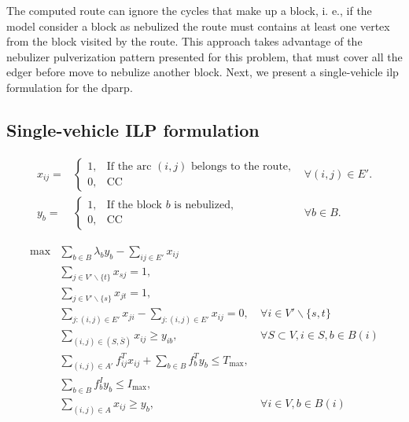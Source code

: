 \documentclass[a4paper,11pt]{article}
\begin{document}
The computed  route can ignore the  cycles that make up  a block, i. e.,  if the
model consider a block as nebulized the  route must contains at least one vertex
from  the block  visited by  the  route. This  approach takes  advantage of  the
nebulizer pulverization pattern presented for  this problem, that must cover all
the  edger  before   move  to  nebulize  another  block.  Next,   we  present  a
single-vehicle \gls{ilp} formulation for the \gls{dparp}.

\subsection{Single-vehicle ILP formulation}

\begin{align}
  \nonumber x_{ij} = & \begin{cases}
                         1, & \text{If the arc $(i, j)$ belongs to the route,} \\
                         0, & \text{CC} 
                       \end{cases} & \forall (i, j) \in E'. \\
  \nonumber y_{b} = & \begin{cases}
                         1, & \text{If the block $b$ is nebulized,} \\
                         0, & \text{CC} 
                       \end{cases} & \forall b \in B.
\end{align}


\begin{align}
  \max & \sum_{b \in B} \lambda_b y_{b} - \sum_{ij \in E'} x_{ij} & \label{eq:of}\\
       & \sum_{j \in V'\backslash \{t\}} x_{sj} = 1, & \label{eq:s-all} \\
       & \sum_{j \in V'\backslash \{s\}} x_{jt} = 1, & \label{eq:all-t} \\
       & \sum_{j: (i, j) \in E'} x_{ji} - \sum_{j: (i, j) \in E'} x_{ij} = 0, & \ \forall i \in V' \backslash \{s, t\} \label{eq:flow-conservation} \\
        & \sum_{(i, j) \in (S, \bar{S})} x_{ij} \geq y_{ib}, & \ \forall S \subset V, i \in S, b \in B(i) \\
       & \sum_{(i, j) \in A'} f^T_{ij} x_{ij} + \sum_{b \in B} f^T_b y_{b} \leq T_{\max}, & \\
       & \sum_{b \in B} f^I_b y_{b} \leq I_{\max}, & \\
       & \sum_{(i, j) \in A} x_{ij} \geq y_{b}, & \ \forall i \in V, b \in B(i)
\end{align}
\end{document}
